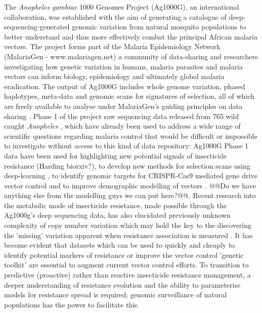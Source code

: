 \documentclass[a4paper,11pt,abstracton,hidelinks]{scrartcl}
\begin{document}
The \textit{Anopheles gambiae} 1000 Genomes Project (Ag1000G), an international collaboration, was established with the aim of generating a catalogue of deep-sequencing-generated genomic variation from natural mosquito populations to better understand and thus more effectively combat the principal African malaria vectors. 
%
The project forms part of the Malaria Epidemiology Network (MalariaGen - www.malariagen.net) a community of data-sharing and researchers investigating how genetic variation in humans, malaria parasites and malaria vectors can inform biology, epidemiology and ultimately global malaria eradication.
%
The output of Ag1000G includes whole genome variation, phased haplotypes, meta-data and genomic scans for signatures of selection, all of which are freely available to analyse under MalariaGen's guiding principles on data sharing \cite{network2008, chokshi2006, parker2009}.
%
Phase 1 of the project saw sequencing data released from 765 wild caught \textit{Anopheles} \cite{Ag1000gConsortium2017}, which have already been used to address a wide range of scientific questions regarding malaria control that would be difficult or impossible to investigate without access to this kind of data repository:
%
Ag1000G Phase 1 data have been used for highlighting new potential signals of insecticide resistance (Harding biorxiv?), to develop new methods for selection scans using deep-learning \cite{xue2019}, to identify genomic targets for CRISPR-Cas9 mediated gene drive vector control \cite{kyrou2018} and to improve demographic modelling of vectors \cite{khatri2018}.
%
@@Do we have anything else from the modelling guys we can put here?@@.
%
Recent research into the metabolic mode of insecticide resistance, made possible through the Ag1000g's deep sequencing data, has also elucidated previously unknown complexity of copy number variation which may hold the key to the discovering the 'missing' variation apparent when resistance association is measured \cite{lucas2019, mitchell2014}.
%
It has become evident that datasets which can be used to quickly and cheaply to identify potential markers of resistance or improve the vector control 'genetic toolkit' are essential to augment current vector control efforts.
%
To transition to predictive (proactive) rather than reactive insecticide resistance management, a deeper understanding of resistance evolution and the ability to parameterise models for resistance spread is required; genomic surveillance of natural populations has the power to facilitate this.
\end{document}
